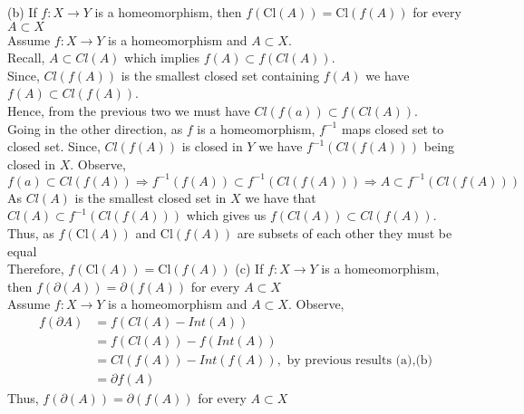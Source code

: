 \documentclass[12pt]{article}
\newcommand{\1}{^{-1}}
\begin{document}
\begin{enumerate}
	(b) If $f: X \rightarrow Y$ is a homeomorphism, then $f(\mathrm{Cl}(A))=\mathrm{Cl}(f(A))$ for every $A \subset X$\\
	Assume $ f: X\to Y $ is a homeomorphism and $ A\subset X $.\\
	Recall, $ A\subset Cl(A) $ which implies $ f(A) \subset f(Cl(A)) $.\\
	Since, $ Cl(f(A)) $ is the smallest closed set containing $f(A)$ we have $ f(A)\subset Cl(f(A)) $.\\
	Hence, from the previous two we must have $ Cl(f(a)) \subset f(Cl(A))$.\\
	Going in the other direction, as $ f $ is a homeomorphism, $ f^{-1} $ maps closed set to closed set. Since, $ Cl(f(A))  $ is closed in $ Y $ we have $ f^{-1}(Cl(f(A))) $ being closed in $ X $. Observe,
	\[f(a)\subset Cl(f(A)) \Rightarrow f^{-1}(f(A))\subset f^{-1}(Cl(f(A))) \Rightarrow A \subset f^{-1}(Cl(f(A))) \]
	As $ Cl(A) $ is the smallest closed set in $ X $ we have that $ Cl(A) \subset f^{-1}(Cl(f(A))) $ which gives us $ f(Cl(A)) \subset Cl(f(A)) $.\\
	Thus, as $ f (\mathrm{Cl}(A)) $ and $ \mathrm{Cl}(f(A)) $ are subsets of each other they must be equal\\
	Therefore, $ f(\mathrm{Cl}(A)) = \mathrm{Cl}(f(A))$
	(c) If $f: X \rightarrow Y$ is a homeomorphism, then $f(\partial(A))=\partial(f(A))$ for every $A \subset X$\\
	Assume $ f: X\to Y $ is a homeomorphism and $ A\subset X $. Observe,
	\begin{align*}
		f(\partial A) &= f(Cl(A)-Int(A))\\
					  &= f(Cl(A))-f(Int(A))\\
					  &= Cl(f(A))-Int(f(A)), \text{ by previous results (a),(b)}\\
					  &=\partial f(A)
	\end{align*}
	Thus, $f(\partial(A))=\partial(f(A))$ for every $A \subset X$\\


\end{enumerate}
\end{document}
